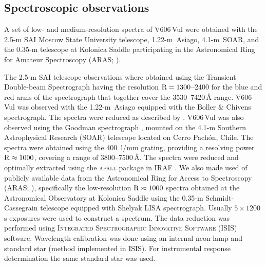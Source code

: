 \documentclass[twocolumn]{aastex631}
\newcommand{\nova}{V606\,Vul}
\begin{document}
\subsection{Spectroscopic observations}
\label{sec:specobs}

A set of low- and medium-resolution spectra of \nova{} were obtained with the 2.5-m SAI Moscow State University
telescope, 1.22-m~Asiago, 4.1-m~SOAR, and 
the 0.35-m telescope at Kolonica Saddle 
participating in the Astronomical Ring for Amateur Spectroscopy
(ARAS; 
\citealt{2019CoSka..49..217T}).

The 2.5-m SAI telescope observations where obtained using the Transient Double-beam Spectrograph
\citep{2020AstL...46..836P,2020AstL...46..429D}
having the resolution ${\rm R}=1300$--2400 for the blue and red arms of the spectrograph
that together cover the 3530--7420\,\AA{} range.
%
\nova{} was observed with the 1.22-m~Asiago equipped with the Boller \& Chivens spectrograph.
The spectra were reduced as described by \cite{2000iasd.book.....Z}. 
%
\nova{} was also observed using the Goodman spectrograph \citep{Clemens_etal_2004}, 
mounted on the 4.1-m Southern Astrophysical Research (SOAR) telescope located on Cerro Pach\'on, Chile. 
The spectra were obtained using the 400~l/mm grating, providing a resolving power ${\rm R} \approx 1000$, 
covering a range of 3800--7500\,\AA. 
The spectra were reduced and optimally extracted using the \textsc{apall} package in \textsc{IRAF} \citep{Tody_1986}. 
We also made used of publicly available data from the Astronomical Ring for Access to Spectroscopy (ARAS;
\citealt{2019CoSka..49..217T}), specifically the low-resolution ${\rm R} \approx 1000$ spectra obtained 
at the Astronomical Observatory at Kolonica Saddle using the 0.35-m Schmidt-Cassegrain telescope 
equipped with Shelyak LISA spectrograph. Usually $5\times1200$\,s exposures were used to construct a
spectrum. The data reduction was performed using \textsc{Integrated Spectrographic Innovative Software (ISIS)} software. 
Wavelength calibration was done using an internal neon lamp and standard star (method implemented in \textsc{ISIS}). 
For instrumental response determination the same standard star was used.
\end{document}
